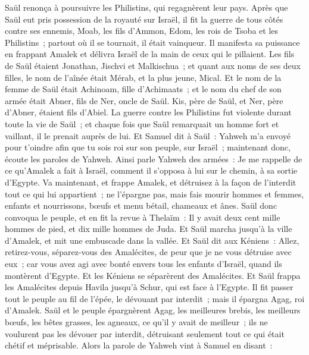 \begin{multicols}{2}
Saül renonça à poursuivre les Philistins, qui regagnèrent leur pays.
Après que Saül eut pris possession de la royauté sur Israël, il fit la guerre de tous côtés contre ses ennemis, Moab, les fils d'Ammon, Edom, les rois de Tsoba et les Philistins~; partout où il se tournait, il était vainqueur.
Il manifesta sa puissance en frappant Amalek et délivra Israël de la main de ceux qui le pillaient.
Les fils de Saül étaient Jonathan, Jischvi et Malkischua~; et quant aux noms de ses deux filles, le nom de l'aînée était Mérab, et la plus jeune, Mical.
Et le nom de la femme de Saül était Achinoam, fille d'Achimaats~; et le nom du chef de son armée était Abner, fils de Ner, oncle de Saül.
Kis, père de Saül, et Ner, père d'Abner, étaient fils d'Abiel.
La guerre contre les Philistins fut violente durant toute la vie de Saül~; et chaque fois que Saül remarquait un homme fort et vaillant, il le prenait auprès de lui.
\VerseOne{}Et Samuel dit à Saül~: Yahweh m'a envoyé pour t'oindre afin que tu sois roi sur son peuple, sur Israël~; maintenant donc, écoute les paroles de Yahweh.
Ainsi parle Yahweh des armées~: Je me rappelle de ce qu'Amalek a fait à Israël, comment il s'opposa à lui sur le chemin, à sa sortie d'Egypte.
Va maintenant, et frappe Amalek, et détruisez à la façon de l'interdit tout ce qui lui appartient~; ne l'épargne pas, mais fais mourir hommes et femmes, enfants et nourrissons, bœufs et menu bétail, chameaux et ânes.
Saül donc convoqua le peuple, et en fit la revue à Thelaïm~: Il y avait deux cent mille hommes de pied, et dix mille hommes de Juda.
Et Saül marcha jusqu'à la ville d'Amalek, et mit une embuscade dans la vallée.
Et Saül dit aux Kéniens~: Allez, retirez-vous, séparez-vous des Amalécites, de peur que je ne vous détruise avec eux~; car vous avez agi avec bonté envers tous les enfants d'Israël, quand ils montèrent d'Egypte. Et les Kéniens se séparèrent des Amalécites.
Et Saül frappa les Amalécites depuis Havila jusqu'à Schur, qui est face à l'Egypte.
Il fit passer tout le peuple au fil de l'épée, le dévouant par interdit~; mais il épargna Agag, roi d'Amalek.
Saül et le peuple épargnèrent Agag, les meilleures brebis, les meilleurs bœufs, les bêtes grasses, les agneaux, ce qu'il y avait de meilleur~; ils ne voulurent pas les dévouer par interdit, détruisant seulement tout ce qui était chétif et méprisable.
Alors la parole de Yahweh vint à Samuel en disant~:

\end{multicols}
